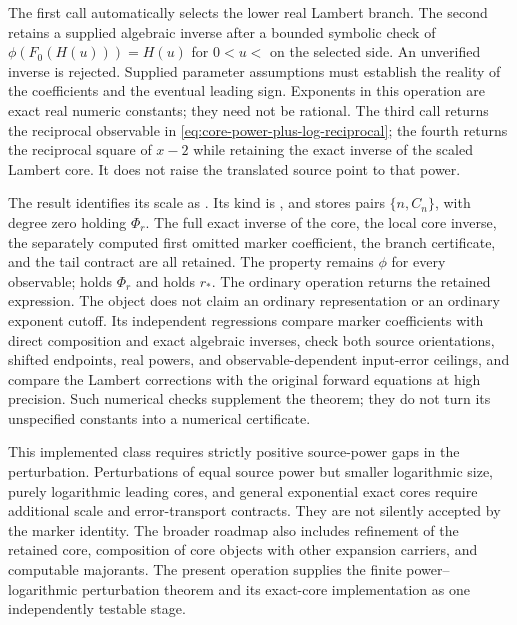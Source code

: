 The first call automatically selects the lower real Lambert branch. The
second retains a supplied algebraic inverse after a bounded symbolic check
of $\phi(F_0(H(u)))=H(u)$ for $0<u<$ on the selected
side. An unverified inverse is rejected. Supplied parameter assumptions
must establish the reality of the coefficients and the eventual leading
sign. Exponents in this operation are exact real numeric constants; they
need not be rational.
The third call returns the reciprocal observable in
\eqref{eq:core-power-plus-log-reciprocal}; the fourth returns the reciprocal
square of $x-2$ while retaining the exact inverse of the scaled Lambert
core. It does not raise the translated source point to that power.

The result identifies its scale as .
Its kind is , and  stores pairs $\{n,C_n\}$,
with degree zero holding $\Phi_r$. The full exact inverse of the core,
the local core inverse, the separately computed first omitted marker
coefficient, the branch certificate, and the tail contract are all retained.
The  property remains $\phi$ for every observable;
 holds $\Phi_r$ and
 holds $r_*$.
The ordinary  operation returns the retained expression. The
object does not claim an ordinary  representation or an
ordinary exponent cutoff. Its independent regressions compare marker
coefficients with direct composition and exact algebraic inverses, check
both source orientations, shifted endpoints, real powers, and
observable-dependent input-error ceilings, and compare
the Lambert corrections with the original forward equations at high
precision. Such numerical checks supplement the theorem; they do not
turn its unspecified constants into a numerical certificate.

This implemented class requires strictly positive source-power gaps in
the perturbation. Perturbations of equal source power but smaller
logarithmic size, purely logarithmic leading cores, and general
exponential exact cores require additional scale and error-transport
contracts. They are not silently accepted by the marker identity.
The broader roadmap also includes refinement of the retained core,
composition of core objects with other expansion carriers, and computable
majorants. The present operation supplies the finite power--logarithmic
perturbation theorem and its exact-core implementation as one independently
testable stage.
